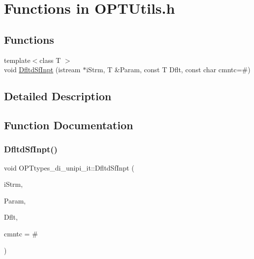 \hypertarget{group___o_p_t_utils___f_u_n_c_t_i_o_n_s}{}\section{Functions in O\+P\+T\+Utils.\+h}
\label{group___o_p_t_utils___f_u_n_c_t_i_o_n_s}
\subsection*{Functions}
\begin{DoxyCompactItemize}
\item 
{\footnotesize template$<$class T $>$ }\\void \mbox{\hyperlink{group___o_p_t_utils___f_u_n_c_t_i_o_n_s_gaf4f201a8b54197416f25f062edc98ca6}{Dfltd\+Sf\+Inpt}} (istream $\ast$i\+Strm, T \&Param, const T Dflt, const char cmntc=\textquotesingle{}\#\textquotesingle{})
\end{DoxyCompactItemize}


\subsection{Detailed Description}


\subsection{Function Documentation}
\mbox{\label{group___o_p_t_utils___f_u_n_c_t_i_o_n_s_gaf4f201a8b54197416f25f062edc98ca6}} 
\subsubsection{\texorpdfstring{Dfltd\+Sf\+Inpt()}{DfltdSfInpt()}}
{\footnotesize\ttfamily void O\+P\+Ttypes\+\_\+di\+\_\+unipi\+\_\+it\+::\+Dfltd\+Sf\+Inpt (\begin{DoxyParamCaption}\item[{istream $\ast$}]{i\+Strm,  }\item[{T \&}]{Param,  }\item[{const T}]{Dflt,  }\item[{const char}]{cmntc = {\ttfamily \textquotesingle{}\#\textquotesingle{}} }\end{DoxyParamCaption})\hspace{0.3cm}{\ttfamily [inline]}}

